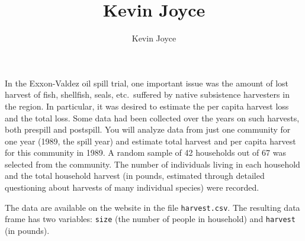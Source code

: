 \documentclass[usenames,dvipsnames]{homework}
\title{Kevin Joyce}
\author{Kevin Joyce}
\begin{document}
 
\newcommand{\figref}[1]{\figurename~\ref{#1}}
\renewcommand{\bar}{\overline}
\renewcommand{\hat}{\widehat}
\renewcommand{\SS}{\mathcal S}
\newcommand{\HH}{\mathscr H}
\newcommand{\mom}{\widetilde}
\newcommand{\mle}{\widehat \Uptheta}
\newcommand{\eps}{\varepsilon}
\newcommand{\todist}{\stackrel{D}\longrightarrow}
\newcommand{\iid}{\stackrel{\mathrm{iid}}\sim}
\newcommand{\toprob}{\stackrel{p}\longrightarrow} \newcommand{\TTheta}{\overline{\underline \Theta} }
\newcommand{\del}{\partial}
\newcommand{\approxsim}{\overset{\cdotp}{\underset{\cdotp}{\sim}}}
\newcommand{\RSS}{\ensuremath{\mathrm{RSS}}}
\newcommand{\MSE}{\ensuremath{\mathrm{MSE}}}
\newcommand{\SE}{\ensuremath{\mathrm{SE}}}
\newcommand{\SD}{\ensuremath{\mathrm{SD}}}
\newcommand{\TSS}{\ensuremath{\mathrm{TSS}}}
\newcommand{\Var}{\ensuremath{\mathrm{Var}}}
\newcommand{\Cov}{\ensuremath{\mathrm{Cov}}}
\newcommand{\SSReg}{\ensuremath{\mathrm{SSReg}}}
\renewcommand{\a}[1]{{\color{red} \it #1}}

\begin{longproblem} In the Exxon-Valdez oil spill trial, one important issue was the amount of lost harvest of fish, shellfish, seals, etc.~suffered by native subsistence harvesters in the region. In particular, it was desired to estimate the per capita harvest loss and the total loss. Some data had been collected over the years on such harvests, both prespill and postspill.  You will analyze data from just one community for one year (1989, the spill year) and estimate total harvest and per capita harvest for this community in 1989. A random sample of 42 households out of 67 was selected from the community.  The number of individuals living in each household and the total household harvest (in pounds, estimated through detailed questioning about harvests of many individual species) were recorded.

The data are available on the website in the file \texttt{harvest.csv}.  The resulting data frame has two variables: \texttt{size} (the number of people in household) and \texttt{harvest} (in pounds).
\end{longproblem}
\end{document}
